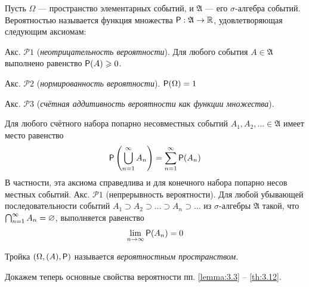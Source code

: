 
\begin{definition}
	\label{def:3.1}
	Пусть $\Omega$ — пространство элементарных событий, и
$\mathfrak{A}$ — его $\sigma$-алгебра событий. Вероятностью называется функция множества
$\P: \mathfrak{A}\rightarrow \mathbb{R}$, удовлетворяющая следующим аксиомам:

Акс. $\mathcal{P}1$ (\textit{неотрицательность вероятности}). Для любого события $A\in\mathfrak{A}$ выполнено равенство $\P(A)\geqslant 0$.

Акс. $\mathcal{P}2$ (\textit{нормированность вероятности}). $\P(\Omega)=1$ 

Акс. $\mathcal{P}3$ (\textit{счётная аддитивность вероятности как функции множества}).
\end{definition}
Для любого счётного набора попарно несовместных событий \newline $A_1,A_2,\dots\in 
\mathfrak{A}$
имеет место равенство
\begin{equation*}
	\P\left(\bigcup_{n=1}^{\infty}A_n \right)=\sum^{\infty}_{n=1}\P(A_n) \notag
\end{equation*}
В частности, эта аксиома справедлива и для конечного набора попарно несов
местных событий.
Акс. $\mathcal{P}1$ (непрерывность вероятности). Для любой убывающей последовательности событий $A_1 \supset A_2 \supset\dots\supset A_n \supset \dots$ из $\sigma$-алгебры $\mathfrak{A}$ такой, что $\bigcap_{n=1}^{\infty}A_n=\noo$,
выполняется равенство
\begin{equation*}
	\lim\limits_{n\to\infty}\P(A_n)=0 \notag
\end{equation*}
\begin{definition}
	\label{def:3.2}
	Тройка $(\Omega,\mathfrak(A),\P)$ называется \textit{вероятностным пространством}.
\end{definition}
Докажем теперь основные свойства вероятности пп. \ref{lemma:3.3} – \ref{th:3.12}.

